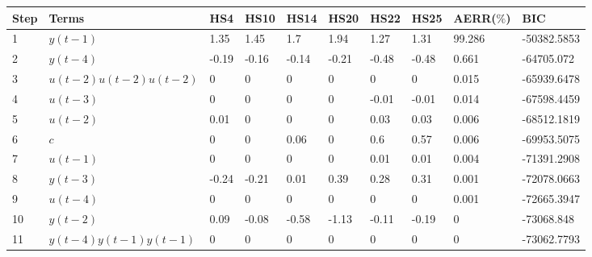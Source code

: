 \begin{tabular}{llllllllll}
Step & Terms & HS4 & HS10 & HS14 & HS20 & HS22 & HS25 & AERR($\%$) & BIC \\ 
\hline 
1 & $y(t-1)$ & 1.35 & 1.45 & 1.7 & 1.94 & 1.27 & 1.31 & 99.286 & -50382.5853 \\ 
2 & $y(t-4)$ & -0.19 & -0.16 & -0.14 & -0.21 & -0.48 & -0.48 & 0.661 & -64705.072 \\ 
3 & $u(t-2)u(t-2)u(t-2)$ & 0 & 0 & 0 & 0 & 0 & 0 & 0.015 & -65939.6478 \\ 
4 & $u(t-3)$ & 0 & 0 & 0 & 0 & -0.01 & -0.01 & 0.014 & -67598.4459 \\ 
5 & $u(t-2)$ & 0.01 & 0 & 0 & 0 & 0.03 & 0.03 & 0.006 & -68512.1819 \\ 
6 & $c$ & 0 & 0 & 0.06 & 0 & 0.6 & 0.57 & 0.006 & -69953.5075 \\ 
7 & $u(t-1)$ & 0 & 0 & 0 & 0 & 0.01 & 0.01 & 0.004 & -71391.2908 \\ 
8 & $y(t-3)$ & -0.24 & -0.21 & 0.01 & 0.39 & 0.28 & 0.31 & 0.001 & -72078.0663 \\ 
9 & $u(t-4)$ & 0 & 0 & 0 & 0 & 0 & 0 & 0.001 & -72665.3947 \\ 
10 & $y(t-2)$ & 0.09 & -0.08 & -0.58 & -1.13 & -0.11 & -0.19 & 0 & -73068.848 \\ 
11 & $y(t-4)y(t-1)y(t-1)$ & 0 & 0 & 0 & 0 & 0 & 0 & 0 & -73062.7793 \\ 
\hline 
\end{tabular}
